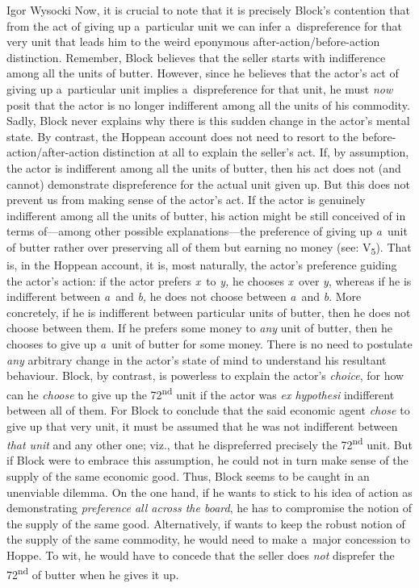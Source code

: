 \begin{artengenv}{Igor Wysocki}
Now, it is crucial to note that it is precisely Block's contention that from the act of giving up a~particular unit we can infer a~dispreference for that very unit that leads him to the weird eponymous after-action/before-action distinction. Remember, Block believes that the seller starts with indifference among all the units of butter. However, since he believes that the actor's act of giving up a~particular unit implies a~dispreference for that unit, he must \textit{now} posit that the actor is no longer indifferent among all the units of his commodity. Sadly, Block never explains why there is this sudden change in the actor's mental state. By contrast, the Hoppean account does not need to resort to the before-action/after-action distinction at all to explain the seller's act. If, by assumption, the actor is indifferent among all the units of butter, then his act does not (and cannot) demonstrate dispreference for the actual unit given up. But this does not prevent us from making sense of the actor's act. If the actor is genuinely indifferent among all the units of butter, his action might be still conceived of in terms of---among other possible explanations---the preference of giving up \textit{a}~unit of butter rather over preserving all of them but earning no money (see: V\textsubscript{5}). That is, in the Hoppean account, it is, most naturally, the actor's preference guiding the actor's action: if the actor prefers \textit{x}~to \textit{y,} he chooses \textit{x}~over \textit{y}, whereas if he is indifferent between \textit{a}~and \textit{b,} he does not choose between \textit{a}~and \textit{b}. More concretely, if he is indifferent between particular units of butter, then he does not choose between them. If he prefers some money to \textit{any} unit of butter, then he chooses to give up \textit{a}~unit of butter for some money. There is no need to postulate \textit{any} arbitrary change in the actor's state of mind to understand his resultant behaviour. Block, by contrast, is powerless to explain the actor's \textit{choice}, for how can he \textit{choose} to give up the 72\textsuperscript{nd} unit if the actor was \textit{ex hypothesi} indifferent between all of them. For Block to conclude that the said economic agent \textit{chose} to give up that very unit, it must be assumed that he was not indifferent between \textit{that unit} and any other one; viz., that he dispreferred precisely the 72\textsuperscript{nd }unit. But if Block were to embrace this assumption, he could not in turn make sense of the supply of the same economic good. Thus, Block seems to be caught in an unenviable dilemma. On the one hand, if he wants to stick to his idea of action as demonstrating \textit{preference all across the board}, he has to compromise the notion of the supply of the same good. Alternatively, if wants to keep the robust notion of the supply of the same commodity, he would need to make a~major concession to Hoppe. To wit, he would have to concede that the seller does \textit{not} disprefer the 72\textsuperscript{nd} of butter when he gives it up.




\end{artengenv}
